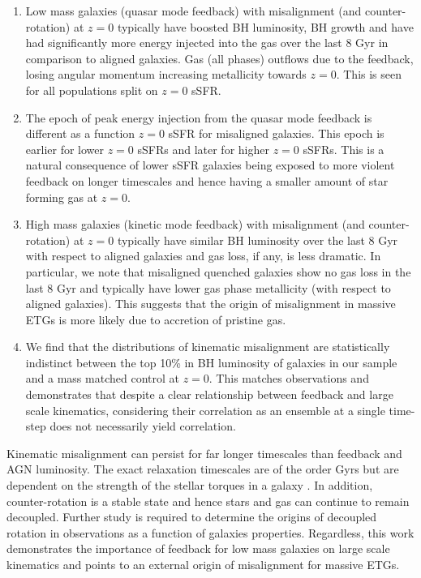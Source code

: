 \documentclass[fleqn,usenatbib]{mnras}
\begin{document}
\begin{enumerate}
    \item Low mass galaxies (quasar mode feedback) with misalignment (and counter-rotation) at $z=0$ typically have boosted BH luminosity, BH growth and have had significantly more energy injected into the gas over the last 8 Gyr in comparison to aligned galaxies. Gas (all phases) outflows due to the feedback, losing angular momentum increasing metallicity towards $z=0$. This is seen for all populations split on $z=0$ sSFR.
    \item The epoch of peak energy injection from the quasar mode feedback is different as a function $z=0$ sSFR for misaligned galaxies. This epoch is earlier for lower $z=0$ sSFRs and later for higher $z=0$ sSFRs. This is a natural consequence of lower sSFR galaxies being exposed to more violent feedback on longer timescales and hence having a smaller amount of star forming gas at $z=0$. 
    \item High mass galaxies (kinetic mode feedback) with misalignment (and counter-rotation) at $z=0$ typically have similar BH luminosity over the last 8 Gyr with respect to aligned galaxies and gas loss, if any, is less dramatic. In particular, we note that misaligned quenched galaxies show no gas loss in the last 8 Gyr and typically have lower gas phase metallicity (with respect to aligned galaxies). This suggests that the origin of misalignment in massive ETGs is more likely due to accretion of pristine gas.
    \item We find that the distributions of kinematic misalignment are statistically indistinct between the top 10\% in BH luminosity of galaxies in our sample and a mass matched control at $z=0$. This matches observations \citep[see Figure 6 in][]{ilha2019} and demonstrates that despite a clear relationship between feedback and large scale kinematics, considering their correlation as an ensemble at a single time-step does not necessarily yield correlation.
\end{enumerate}
Kinematic misalignment can persist for far longer timescales than feedback and AGN luminosity. The exact relaxation timescales are of the order Gyrs but are dependent on the strength of the stellar torques in a galaxy \citep[e.g.][]{davis2016}. In addition, counter-rotation is a stable state and hence stars and gas can continue to remain decoupled. Further study is required to determine the origins of decoupled rotation in observations as a function of galaxies properties. Regardless, this work demonstrates the importance of feedback for low mass galaxies on large scale kinematics and points to an external origin of misalignment for massive ETGs.
\end{document}
